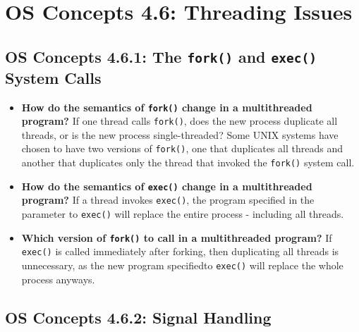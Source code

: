 \documentclass[12pt]{article}
\begin{document}
\section*{OS Concepts 4.6: Threading Issues}

\subsection*{OS Concepts 4.6.1: The \texttt{fork()} and \texttt{exec()} System Calls}

\begin{itemize}
    \item \textbf{How do the semantics of \texttt{fork()} change in a multithreaded program?} If one thread calls \texttt{fork()}, does the new process duplicate all threads, or is the new process single-threaded? Some UNIX systems have chosen to have two versions of \texttt{fork()}, one that duplicates all threads and another that duplicates only the thread that invoked the \texttt{fork()} system call.
    \item \textbf{How do the semantics of \texttt{exec()} change in a multithreaded program?} If a thread invokes \texttt{exec()}, the program specified in the parameter to \texttt{exec()} will replace the entire process - including all threads.
    \item \textbf{Which version of \texttt{fork()} to call in a multithreaded program?} If \texttt{exec()} is called immediately after forking, then duplicating all threads is unnecessary, as the new program specifiedto \texttt{exec()} will replace the whole process anyways.
\end{itemize}

\subsection*{OS Concepts 4.6.2: Signal Handling}
\end{document}
